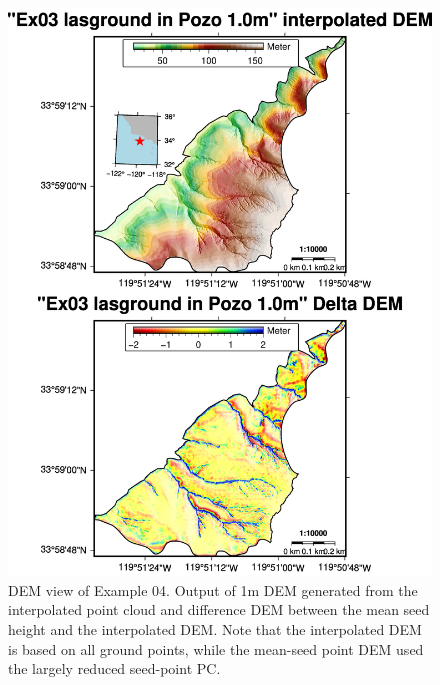 \documentclass[a4paperpaper,,tablecaptionabove]{scrartcl}
\begin{document}
\begin{figure}
\centering
\includegraphics[width=\textwidth,height=0.9\textheight]{./tex2pdf.-e6884bf2dada0f3b/22b3bc909f5543a78026154771e6cd6dbec5c2b8.png}
\caption{DEM view of Example 04. Output of 1m DEM generated from the
interpolated point cloud and difference DEM between the mean seed height
and the interpolated DEM. Note that the interpolated DEM is based on all
ground points, while the mean-seed point DEM used the largely reduced
seed-point PC.\label{Fig:Ex04_cl2_1.0m_2panel_DEMs}}
\end{figure}
\end{document}
